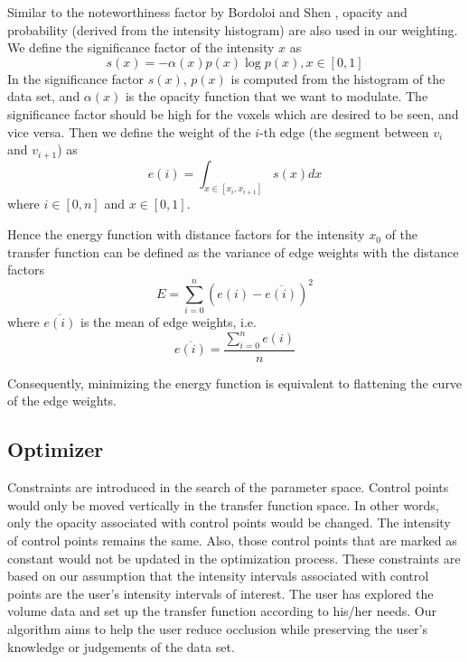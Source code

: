 Similar to the noteworthiness factor by Bordoloi and Shen \cite{bordoloi_view_2005}, opacity and probability (derived from the intensity histogram) are also used in our weighting.
We define the significance factor of the intensity $ x $ as
\[
s(x)=-\alpha(x)p(x) \log p(x), x \in [0,1]
\]
In the significance factor $ s(x)$, $ p(x) $ is computed from the histogram of the data set, and $ \alpha(x) $ is the opacity function that we want to modulate.
The significance factor should be high for the voxels which are desired to be seen, and vice versa.
Then we define the weight of the $ i $-th edge (the segment between $ v_{i} $ and $ v_{i+1} $) as
\[
e(i)=\int_{x \in [x_{i}, x_{i+1}]} s(x) dx
\]
where $ i \in [0,n]$ and $ x \in [0,1] $.

Hence the energy function with distance factors for the intensity $ x_{0} $ of the transfer function can be defined as the variance of edge weights with the distance factors
\[
E=\sum_{i=0}^{n}(e(i)-\overline{e(i)})^{2}
\]
where $ \overline{e(i)} $ is the mean of edge weights, i.e.
\[
\overline{e(i)}= \frac{\sum_{i=0}^{n}e(i)}{n}
\]
%

Consequently, minimizing the energy function is equivalent to flattening the curve of the edge weights.

\subsection{Optimizer}
\label{sec:optimizer}
Constraints are introduced in the search of the parameter space. Control points would only be moved vertically in the transfer function space. In other words, only the opacity associated with control points would be changed. The intensity of control points remains the same. Also, those control points that are marked as constant would not be updated in the optimization process.
These constraints are based on our assumption that the intensity intervals associated with control points are the user's intensity intervals of interest. The user has explored the volume data and set up the transfer function according to his/her needs. Our algorithm aims to help the user reduce occlusion while preserving the user's knowledge or judgements of the data set.

